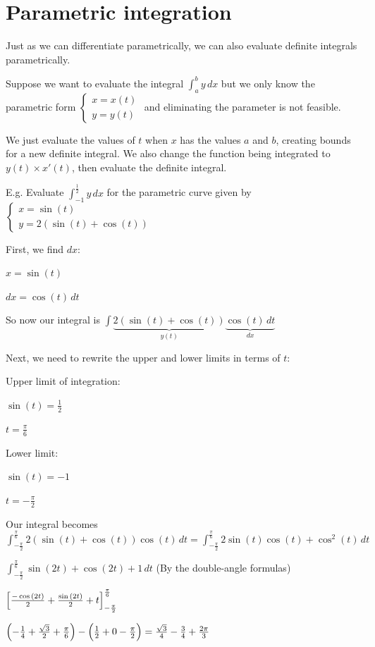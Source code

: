 \documentclass[../main.tex]{subfiles}
\begin{document}
\section{Parametric integration}
Just as we can differentiate parametrically, we can also evaluate definite integrals parametrically.

Suppose we want to evaluate the integral $\int_a^b y\,dx$ but we only know the parametric form $\begin{cases} x=x(t) \\ y=y(t) \end{cases}$ and eliminating the parameter is not feasible.

We just evaluate the values of $t$ when $x$ has the values $a$ and $b$, creating bounds for a new definite integral. We also change the function being integrated to $y(t)\times x'(t)$, then evaluate the definite integral.

E.g. Evaluate $\int_{-1}^{\frac{1}{2}}y\,dx$ for the parametric curve given by $\begin{cases} x=\sin{(t)} \\ y=2(\sin{(t)}+\cos{(t)}) \end{cases}$

First, we find $dx$:

$x=\sin{(t)}$

$dx=\cos{(t)}\,dt$

So now our integral is $\int \underbrace{2(\sin{(t)}+\cos{(t)})}_{y(t)}\underbrace{\cos{(t)}\,dt}_{dx}$

Next, we need to rewrite the upper and lower limits in terms of $t$:

Upper limit of integration:

$\sin{(t)}=\frac{1}{2}$

$t=\frac{\pi}{6}$

Lower limit:

$\sin{(t)}=-1$

$t=-\frac{\pi}{2}$

Our integral becomes $\int_{-\frac{\pi}{2}}^{\frac{\pi}{6}}2(\sin{(t)}+\cos{(t)})\cos{(t)}\,dt=\int_{-\frac{\pi}{2}}^{\frac{\pi}{6}}2\sin{(t)}\cos{(t)}+\cos^2{(t)}\,dt$

$\int_{-\frac{\pi}{2}}^{\frac{\pi}{6}}\sin{(2t)}+\cos{(2t)}+1\,dt$ (By the double-angle formulas)

$\Bigl[\frac{-\cos{(2t)}}{2}+\frac{\sin{(2t)}}{2}+t \Bigr]_{-\frac{\pi}{2}}^{\frac{\pi}{6}}$

$\Bigl(-\frac{1}{4}+\frac{\sqrt{3}}{2}+\frac{\pi}{6}\Bigr)-\Bigl(\frac{1}{2}+0-\frac{\pi}{2}\Bigr)=\frac{\sqrt{3}}{4}-\frac{3}{4}+\frac{2\pi}{3}$
\end{document}
